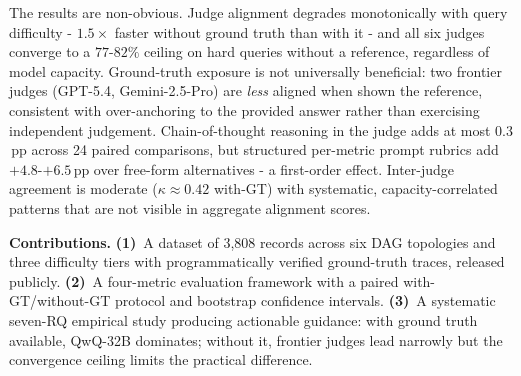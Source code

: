The results are non-obvious. Judge alignment degrades monotonically with query difficulty - $1.5\times$ faster without ground truth than with it - and all six judges converge to a $77$-$82\%$ ceiling on hard queries without a reference, regardless of model capacity. Ground-truth exposure is not universally beneficial: two frontier judges (GPT-5.4, Gemini-2.5-Pro) are \emph{less} aligned when shown the reference, consistent with over-anchoring to the provided answer rather than exercising independent judgement. Chain-of-thought reasoning in the judge adds at most $0.3$\,pp across 24 paired comparisons, but structured per-metric prompt rubrics add $+4.8$-$+6.5$\,pp over free-form alternatives - a first-order effect. Inter-judge agreement is moderate ($\kappa \approx 0.42$ with-GT) with systematic, capacity-correlated patterns that are not visible in aggregate alignment scores.

\noindent\textbf{Contributions.} \textbf{(1)}~A dataset of 3,808 records across six DAG topologies and three difficulty tiers with programmatically verified ground-truth traces, released publicly. \textbf{(2)}~A four-metric evaluation framework with a paired with-GT/without-GT protocol and bootstrap confidence intervals. \textbf{(3)}~A systematic seven-RQ empirical study producing actionable guidance: with ground truth available, QwQ-32B dominates; without it, frontier judges lead narrowly but the convergence ceiling limits the practical difference.
